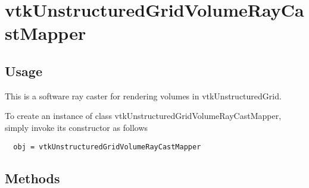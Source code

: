 \section{vtkUnstructuredGridVolumeRayCastMapper}

\subsection{Usage}

 This is a software ray caster for rendering volumes in vtkUnstructuredGrid. 

To create an instance of class vtkUnstructuredGridVolumeRayCastMapper, simply
invoke its constructor as follows
\begin{verbatim}
  obj = vtkUnstructuredGridVolumeRayCastMapper
\end{verbatim}
\subsection{Methods}

